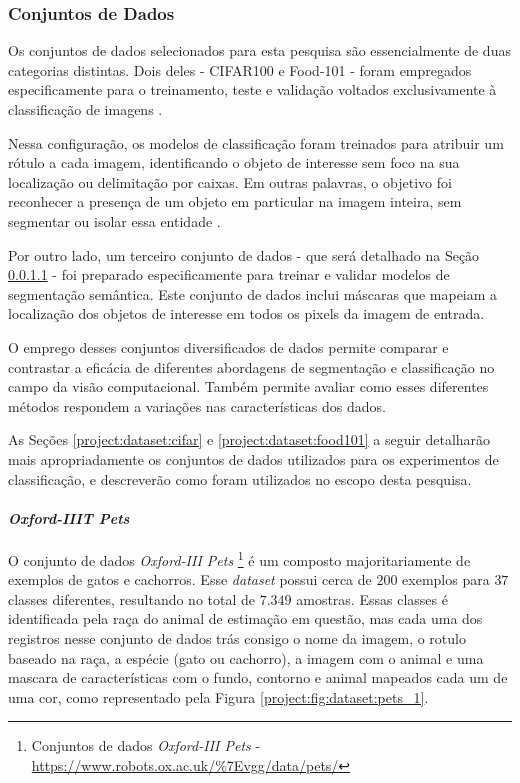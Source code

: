 \subsubsection{Conjuntos de Dados}
\label{project:dataset}
Os conjuntos de dados selecionados para esta pesquisa são essencialmente de duas categorias distintas. Dois deles - CIFAR100 e Food-101 - foram empregados especificamente para o treinamento, teste e validação voltados exclusivamente à classificação de imagens \citep{Krizhevsky2009LearningImages, Bossard2014Food-101Forests}.

Nessa configuração, os modelos de classificação foram treinados para atribuir um rótulo a cada imagem, identificando o objeto de interesse sem foco na sua localização ou delimitação por caixas. Em outras palavras, o objetivo foi reconhecer a presença de um objeto em particular na imagem inteira, sem segmentar ou isolar essa entidade \citep{Viitaniemi2008TechniquesSegmentation}.

Por outro lado, um terceiro conjunto de dados - que será detalhado na Seção \ref{project:dataset:pets} - foi preparado especificamente para treinar e validar modelos de segmentação semântica. Este conjunto de dados inclui máscaras que mapeiam a localização dos objetos de interesse em todos os pixels da imagem de entrada.

O emprego desses conjuntos diversificados de dados permite comparar e contrastar a eficácia de diferentes abordagens de segmentação e classificação no campo da visão computacional. Também permite avaliar como esses diferentes métodos respondem a variações nas características dos dados.

As Seções \ref{project:dataset:cifar} e \ref{project:dataset:food101} a seguir detalharão mais apropriadamente os conjuntos de dados utilizados para os experimentos de classificação, e descreverão como foram utilizados no escopo desta pesquisa.

\paragraph{\textit{Oxford-IIIT Pets}}
\label{project:dataset:pets}

O conjunto de dados \textit{Oxford-III Pets} \footnote{Conjuntos de dados \textit{Oxford-III Pets} - \url{https://www.robots.ox.ac.uk/\%7Evgg/data/pets/}} \citep{Parkhi2012CatsDogs} é um composto majoritariamente de exemplos de gatos e cachorros. Esse \textit{dataset} possui cerca de $200$ exemplos para $37$ classes diferentes, resultando no total de $7.349$ amostras. Essas classes é identificada pela raça do animal de estimação em questão, mas cada uma dos registros nesse conjunto de dados trás consigo o nome da imagem, o rotulo baseado na raça, a espécie (gato ou cachorro), a imagem com o animal e uma mascara de características com o fundo, contorno e animal mapeados cada um de uma cor, como representado pela Figura \ref{project:fig:dataset:pets_1}.

